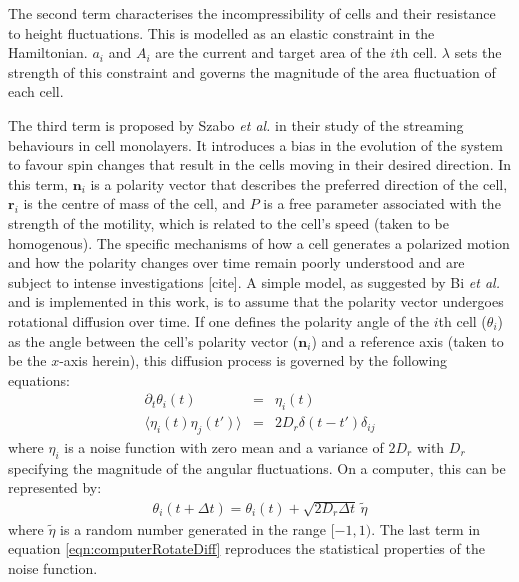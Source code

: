 \documentclass[a4paper,12pt]{article}
\newcommand{\etal}{\textit{et al. }}
\begin{document}
The second term characterises the incompressibility of cells and their resistance to height fluctuations. This is modelled as an elastic constraint in the Hamiltonian. $a_i$ and $A_i$ are the current and target area of the $i$th cell. $\lambda$ sets the strength of this constraint and governs the magnitude of the area fluctuation of each cell. 

The third term is proposed by Szabo \etal in their study of the streaming behaviours in cell monolayers\cite{szabo2010}. It introduces a bias in the evolution of the system to favour spin changes that result in the cells moving in their desired direction. In this term, $\bm{n}_i$ is a polarity vector that describes the preferred direction of the cell,  $\bm{r}_i$ is the centre of mass of the cell, and $P$ is a free parameter associated with the strength of the motility, which is related to the cell's speed (taken to be homogenous). The specific mechanisms of how a cell generates a polarized motion and how the polarity changes over time remain poorly understood and are subject to intense investigations [cite]. A simple model, as suggested by Bi \etal and is implemented in this work, is to assume that the polarity vector undergoes rotational diffusion over time. If one defines the polarity angle of the $i$th cell ($\theta_i$) as the angle between the cell's polarity vector ($\bm{n}_i$) and a reference axis (taken to be the $x$-axis herein), this diffusion process is governed by the following equations:
\begin{eqnarray}
\partial_t\theta_i(t) & = & \eta_i(t)\\
\langle{\eta_i(t)\eta_j(t')\rangle} & = & 2D_r\delta(t-t')\delta_{ij}
\end{eqnarray}
where $\eta_i$ is a noise function with zero mean and a variance of $2D_r$ with $D_r$ specifying the magnitude of the angular fluctuations. On a computer, this can be represented by:
\begin{eqnarray}
\label{eqn:computerRotateDiff}
\theta_i(t+\Delta t) = \theta_i(t) + \sqrt{2D_r\Delta t}\,\tilde\eta
\end{eqnarray}
where $\tilde\eta$ is a random number generated in the range $[-1,1)$. The last term in equation \ref{eqn:computerRotateDiff} reproduces the statistical properties of the noise function. 
\end{document}
